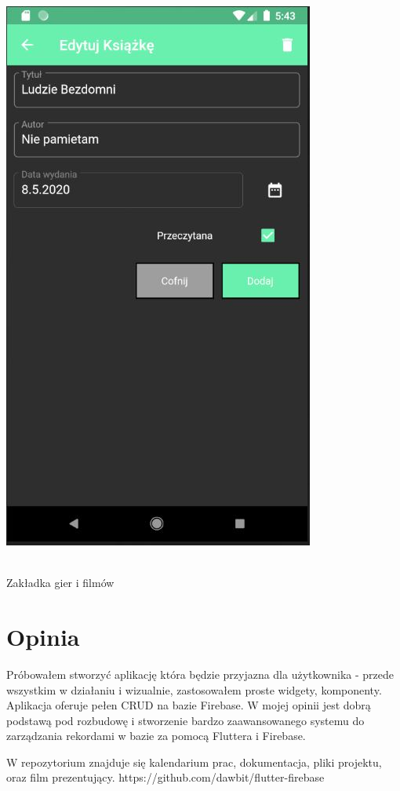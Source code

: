 \documentclass[12pt,a4paper]{article}
\begin{document}
\begin{center}
        \includegraphics[scale=0.70]{8.JPG}
            \begin{scriptsize}
            \\ Zakładka gier i filmów
            \end{scriptsize}
    \end{center}
    
	\section{Opinia}
Próbowałem stworzyć aplikację która będzie przyjazna dla użytkownika - przede wszystkim w działaniu i wizualnie, zastosowałem proste widgety, komponenty. Aplikacja oferuje pełen CRUD na bazie Firebase. W mojej opinii jest dobrą podstawą pod rozbudowę i stworzenie bardzo zaawansowanego systemu do zarządzania rekordami w bazie za pomocą Fluttera i Firebase.

W repozytorium znajduje się kalendarium prac, dokumentacja, pliki projektu, oraz film prezentujący.
https://github.com/dawbit/flutter-firebase
\end{document}
